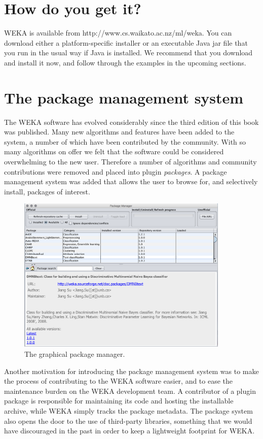 \section{How do you get it?}

WEKA is available from http://www.cs.waikato.ac.nz/ml/weka. You can
download either a platform-speciﬁc installer or an executable Java jar
ﬁle that you run in the usual way if Java is installed. We recommend
that you download and install it now, and follow through the examples
in the upcoming sections.

\section{The package management system}

The WEKA software has evolved considerably since the third edition of
this book was published. Many new algorithms and features have been
added to the system, a number of which have been contributed by the
community. With so many algorithms on offer we felt that the software
could be considered overwhelming to the new user. Therefore a number
of algorithms and community contributions were removed and placed into
plugin {\em packages}. A package management system was added that allows the
user to browse for, and selectively install, packages of interest.

\begin{figure}[!th]
\centering
\includegraphics[width=0.9\textwidth]{images/P1.png}
\caption{The graphical package manager.}
\label{fig:package_manager}
\end{figure}

Another motivation for introducing the package management system was
to make the process of contributing to the WEKA software easier, and
to ease the maintenance burden on the WEKA development team. A
contributor of a plugin package is responsible for maintaining its
code and hosting the installable archive, while WEKA simply tracks
the package metadata. The package system also opens the door to the
use of third-party libraries, something that we would have discouraged
in the past in order to keep a lightweight footprint for WEKA.  

